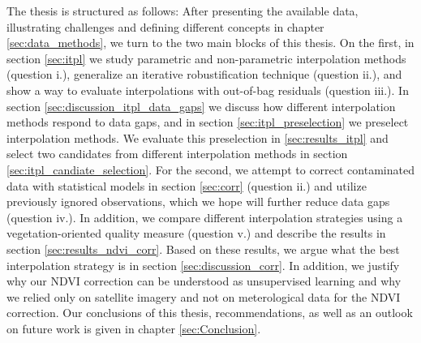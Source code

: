 The thesis is structured as follows: After presenting the available data, illustrating challenges and defining different concepts in chapter \ref{sec:data_methods}, we turn to the two main blocks of this thesis. 
On the first, in section \ref{sec:itpl} we study parametric and non-parametric interpolation methods (question i.), generalize an iterative robustification technique (question ii.), and show a way to evaluate interpolations with out-of-bag residuals (question iii.). In section \ref{sec:discussion_itpl_data_gaps} we discuss how different interpolation methods respond to data gaps, and in section \ref{sec:itpl_preselection} we preselect interpolation methods. We evaluate this preselection in \ref{sec:results_itpl} and select two candidates from different interpolation methods in section \ref{sec:itpl_candiate_selection}.
For the second, we attempt to correct contaminated data with statistical models in section \ref{sec:corr} (question ii.) and utilize previously ignored observations, which we hope will further reduce data gaps (question iv.). In addition, we compare different interpolation strategies using a vegetation-oriented quality measure (question v.) and describe the results in section \ref{sec:results_ndvi_corr}. Based on these results, we argue what the best interpolation strategy is in section \ref{sec:discussion_corr}. In addition, we justify why our NDVI correction can be understood as unsupervised learning and why we relied only on satellite imagery and not on meterological data for the NDVI correction.
Our conclusions of this thesis, recommendations, as well as an outlook on future work is given in chapter \ref{sec:Conclusion}. 


















